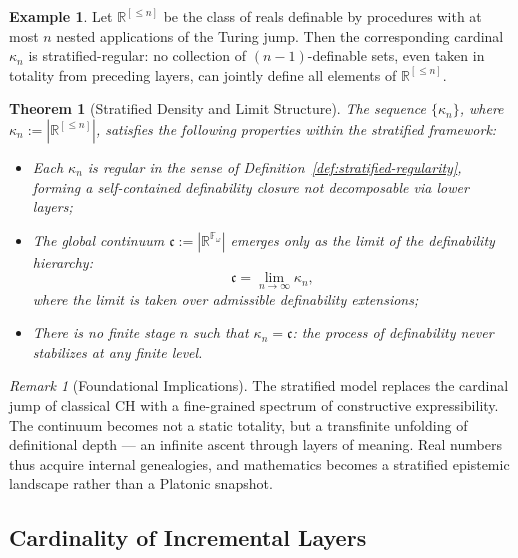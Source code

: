 \documentclass[12pt]{article}
\theoremstyle{definition}
\newtheorem{example}{Example}[section]
\theoremstyle{plain}
\newtheorem{theorem}[definition]{Theorem}
\theoremstyle{remark}
\newtheorem*{remark}{Remark}
\begin{document}
\begin{example}
Let \( \mathbb{R}^{[\leq n]} \) be the class of reals definable by procedures with at most \( n \) nested applications of the Turing jump. Then the corresponding cardinal \( \kappa_n \) is stratified-regular: no collection of \((n{-}1)\)-definable sets, even taken in totality from preceding layers, can jointly define all elements of \( \mathbb{R}^{[\leq n]} \).
\end{example}

\begin{theorem}[Stratified Density and Limit Structure]
The sequence \( \{ \kappa_n \} \), where \( \kappa_n := \left| \mathbb{R}^{[\leq n]} \right| \), satisfies the following properties within the stratified framework:
\begin{itemize}
    \item Each \( \kappa_n \) is \emph{regular} in the sense of Definition~\ref{def:stratified-regularity}, forming a self-contained definability closure not decomposable via lower layers;

    \item The global continuum \( \mathfrak{c} := \left| \mathbb{R}^{\mathbb{F}_\omega} \right| \) emerges only as the limit of the definability hierarchy:
    \[
        \mathfrak{c} = \lim_{n \to \infty} \kappa_n,
    \]
    where the limit is taken over admissible definability extensions;

    \item There is no finite stage \( n \) such that \( \kappa_n = \mathfrak{c} \): the process of definability never stabilizes at any finite level.
\end{itemize}
\end{theorem}

\begin{remark}[Foundational Implications]
The stratified model replaces the cardinal jump of classical CH with a fine-grained spectrum of constructive expressibility. The continuum becomes not a static totality, but a transfinite unfolding of definitional depth — an infinite ascent through layers of meaning. Real numbers thus acquire internal genealogies, and mathematics becomes a stratified epistemic landscape rather than a Platonic snapshot.
\end{remark}

\subsection*{Cardinality of Incremental Layers}
\end{document}

